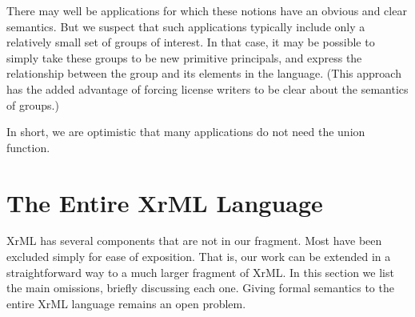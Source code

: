 \documentclass{acmtrans2m}
\newcommand{\<}{
}
\renewcommand{\>}{\rangle}
\begin{document}
\begin{itemize}
There may well be applications for which these notions have an obvious and
clear semantics.  But we suspect that such applications typically include
only a relatively small set of groups of interest.
In that case, it may be possible to simply take these groups
to be new primitive principals, and express the relationship between the
group and its elements in the language.  (This approach has the added
advantage of forcing license writers to be clear about the semantics of
groups.)
\end{itemize}
In short, we are optimistic that many applications do not need the union function.

\section{The Entire XrML Language}\label{s:core}
XrML has several components that are not in our fragment.  Most have been excluded simply for ease of
exposition.
That is, our work can be extended in a straightforward way to a
much larger fragment of XrML.
In this section we list the main omissions, briefly discussing each one.
Giving formal semantics to the entire XrML language remains an open problem.
\end{document}
